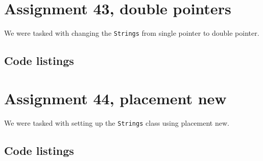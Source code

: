 \documentclass[11pt]{article}
\begin{document}



\section*{Assignment 43, double pointers}
We were tasked with changing the \texttt{Strings} from single pointer to double pointer.

\subsection*{Code listings}










\section*{Assignment 44, placement new}
We were tasked with setting up the \texttt{Strings} class using placement new.

\subsection*{Code listings}









\end{document}
